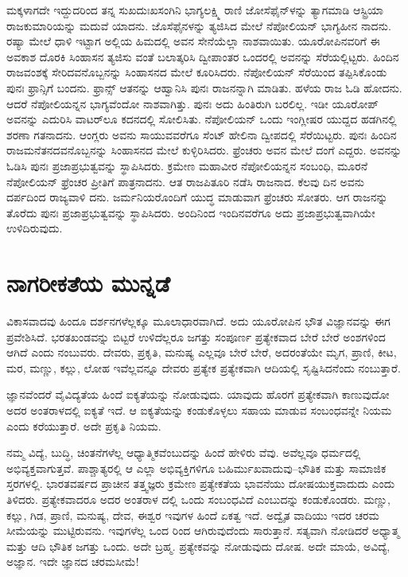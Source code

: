 ಮಕ್ಕಳಾಗದೇ ಇದ್ದುದರಿಂದ ತನ್ನ ಸುಖದುಃಖಸಂಗಿನಿ ಭಾಗ್ಯಲಕ್ಷ್ಮಿ ರಾಣಿ ಜೋಸೆಫೈನ್​ಳನ್ನು ತ್ಯಾಗಮಾಡಿ ಆಸ್ಟ್ರಿಯಾ ರಾಜಕುಮಾರಿಯನ್ನು ಮದುವೆ ಯಾದನು. ಜೊಸೆಫೈನಳನ್ನು ತ್ಯಜಿಸಿದ ಮೇಲೆ ನೆಪೋಲಿಯನ್​ ಭಾಗ್ಯಹೀನ ನಾದನು. ರಷ್ಯಾ ಮೇಲೆ ಧಾಳಿ ಇಟ್ಟಾಗ ಅಲ್ಲಿಯ ಹಿಮದಲ್ಲಿ ಅವನ ಸೇನೆಯೆಲ್ಲಾ ನಾಶವಾಯಿತು. ಯೂರೋಪಿನವರಿಗೆ ಈ ಅವಕಾಶ ದೊರಕಿ ಸಿಂಹಾಸನ ತ್ಯಜಿಸು ವಂತೆ ಬಲಾತ್ಕರಿಸಿ ದ್ವೀಪಾಂತರ ಒಂದರಲ್ಲಿ ಅವನನ್ನು ಸೆರೆಯಲ್ಲಿಟ್ಟರು. ಹಿಂದಿನ ರಾಜವಂಶಕ್ಕೆ ಸೇರಿದವನೊಬ್ಬನನ್ನು ಸಿಂಹಾಸನದ ಮೇಲೆ ಕೂರಿಸಿದರು. ನೆಪೋಲಿಯನ್​ ಸೆರೆಯಿಂದ ತಪ್ಪಿಸಿಕೊಂಡು ಪುನಃ ಫ್ರಾನ್ಸಿಗೆ ಬಂದನು. ಫ್ರಾನ್ಸ್​ ಆತನನ್ನು ಆಹ್ವಾನಿಸಿ ಪುನಃ ರಾಜನನ್ನಾಗಿ ಮಾಡಿತು. ಹಳೆಯ ರಾಜ ಓಡಿ ಹೋದನು. ಆದರೆ ನೆಪೋಲಿಯನ್ನನ ಭಾಗ್ಯವೆಂದೋ ನಾಶವಾಗಿತ್ತು. ಪುನಃ ಅದು ಹಿಂತಿರುಗಿ ಬರಲಿಲ್ಲ. ಇಡೀ ಯೂರೋಪ್​ ಅವನನ್ನು ಎದುರಿಸಿ ವಾಟರ್​ಲೂ ಕದನದಲ್ಲಿ ಸೋಲಿಸಿತು. ನೆಪೋಲಿಯನ್​ ಒಂದು ಇಂಗ್ಲೀಷರ ಯುದ್ದದ ಹಡಗಿನಲ್ಲಿ ಶರಣಾ ಗತನಾದನು. ಆಂಗ್ಲರು ಅವನು ಸಾಯುವವರೆಗೂ ಸೆಂಟ್​ ಹೇಲಿನಾ ದ್ವೀಪದಲ್ಲಿ ಸೆರೆಯಿಟ್ಟರು. ಪುನಃ ಹಿಂದಿನ ರಾಜಮನೆತನದವನೊಬ್ಬನನ್ನು ಸಿಂಹಾಸನದ ಮೇಲೆ ಕುಳ್ಳಿರಿಸಿದರು. ಫ್ರೆಂಚರು ಅವನ ಮೇಲೆ ದಂಗೆ ಎದ್ದರು. ಅವನನ್ನು ಓಡಿಸಿ ಪುನಃ ಪ್ರಜಾಪ್ರಭುತ್ವವನ್ನು ಸ್ಥಾಪಿಸಿದರು. ಕ್ರಮೇಣ ಮಹಾವೀರ ನೆಪೋಲಿಯನ್ನನ ಸಂಬಂಧಿ, ಮೂರನೆ ನೆಪೋಲಿಯನ್​ ಫ್ರೆಂಚರ ಪ್ರೀತಿಗೆ ಪಾತ್ರನಾದನು. ಆತ ರಾಜಪಿತೂರಿ ನಡೆಸಿ ರಾಜನಾದ. ಕೆಲವು ದಿನ ಅವನು ದರ್ಪದಿಂದ ರಾಜ್ಯವಾಳಿ ದನು. ಜರ್ಮನಿಯರೊಂದಿಗೆ ಯುದ್ಧ ಮಾಡುವಾಗ ಫ್ರೆಂಚರು ಸೋತರು. ಆಗ ರಾಜನನ್ನು ತೊರೆದು ಪುನಃ ಪ್ರಜಾಪ್ರಭುತ್ವವನ್ನು ಸ್ಥಾಪಿಸಿದರು. ಅಂದಿನಿಂದ ಇಂದಿನವರೆಗೂ ಅದು ಪ್ರಜಾಪ್ರಭುತ್ವವಾಗಿಯೇ ಉಳಿದಿರುವುದು.


\section{ನಾಗರೀಕತೆಯ ಮುನ್ನಡೆ}

ವಿಕಾಸವಾದವು ಹಿಂದೂ ದರ್ಶನಗಳೆಲ್ಲಕ್ಕೂ ಮೂಲಾಧಾರವಾಗಿದೆ. ಅದು ಯೂರೋಪಿನ ಭೌತ ವಿಜ್ಞಾನವನ್ನು ಈಗ ಪ್ರವೇಶಿಸಿದೆ. ಭರತಖಂಡವನ್ನು ಬಿಟ್ಟರೆ ಉಳಿದೆಲ್ಲರೂ ಜಗತ್ತು ಸಂಪೂರ್ಣ ಪ್ರತ್ಯೇಕವಾದ ಬೇರೆ ಬೇರೆ ಅಂಶಗಳಿಂದ ಆಗಿದೆ ಎಂದು ನಂಬುವರು. ದೇವರು, ಪ್ರಕೃತಿ, ಮನುಷ್ಯ ಎಲ್ಲವೂ ಬೇರೆ ಬೇರೆ, ಅದರಂತೆಯೇ ಮೃಗ, ಪ್ರಾಣಿ, ಕೀಟ, ಮರ, ಮಣ್ಣು, ಕಲ್ಲು, ಲೋಹ ಇವೆಲ್ಲವನ್ನೂ ದೇವರು ಪ್ರತ್ಯೇಕ ಪ್ರತ್ಯೇಕವಾಗಿ ಆದಿಯಲ್ಲಿ ಸೃಷ್ಟಿಸಿದನೆಂದು ನಂಬುತ್ತಾರೆ.

ಜ್ಞಾನವೆಂದರೆ ವೈವಿದ್ಯತೆಯ ಹಿಂದೆ ಐಕ್ಯತೆಯನ್ನು ನೋಡುವುದು. ಯಾವುದು ಹೊರಗೆ ಪ್ರತ್ಯೇಕವಾಗಿ ಕಾಣುವುದೋ ಅದರ ಅಂತರಾಳದಲ್ಲಿ ಐಕ್ಯತೆ ಇದೆ. ಆ ಐಕ್ಯತೆಯನ್ನು ಕಂಡುಕೊಳ್ಳಲು ಸಹಾಯ ಮಾಡುವ ಸಂಬಂಧವನ್ನೇ ನಿಯಮ ಎಂದು ಕರೆಯುತ್ತಾರೆ. ಅದೇ ಪ್ರಕೃತಿ ನಿಯಮ.

ನಮ್ಮ ವಿದ್ಯೆ, ಬುದ್ಧಿ, ಚಿಂತನೆಗಳೆಲ್ಲ ಆಧ್ಯಾತ್ಮಿಕವೆಂಬುದನ್ನು ಹಿಂದೆ ಹೇಳಿರು ವೆವು. ಅವೆಲ್ಲವೂ ಧರ್ಮದಲ್ಲಿ ಅಭಿವ್ಯಕ್ತವಾಗುತ್ತವೆ. ಪಾಶ್ಚಾತ್ಯರಲ್ಲಿ ಆ ಎಲ್ಲಾ ಅಭಿವ್ಯಕ್ತಿಗಳಿಗೂ ಬಹಿರ್ಮುಖವಾದುವು–ಭೌತಿಕ ಮತ್ತು ಸಾಮಾಜಿಕ ಸ್ತರಗಳಲ್ಲಿ. ಭಾರತವರ್ಷದ ಪ್ರಾಚೀನ ತತ್ತ್ವಜ್ಞರು ಕ್ರಮೇಣ ಪ್ರತ್ಯೇಕತೆಯ ಭಾವನೆಯು ದೋಷಯುಕ್ತವಾದುದು ಎಂದು ತಿಳಿದರು. ಪ್ರತ್ಯೇಕವಾದರೂ ಅದರ ಅಂತರಾಳ ದಲ್ಲಿ ಒಂದು ಸಂಬಂಧವಿದೆ ಎಂಬುದನ್ನು ಕಂಡುಕೊಂಡರು. ಮಣ್ಣು, ಕಲ್ಲು, ಗಿಡ, ಪ್ರಾಣಿ, ಮನುಷ್ಯ, ದೇವ, ಈಶ್ವರ ಇವುಗಳ ಹಿಂದೆ ಏಕತ್ವ ಇದೆ. ಅದ್ವೈತ ವಾದಿಯು ಇದರ ಚರಮ ಸೀಮೆಯನ್ನು ಮುಟ್ಟಿರುವನು. ಇವುಗಳೆಲ್ಲ ಒಂದ ರಿಂದ ಆಗಿರುವುದೆಂದು ಸಾರುತ್ತಾನೆ. ಸತ್ಯವಾಗಿ ನೋಡಿದರೆ ಅಧ್ಯಾತ್ಮ ಮತ್ತು ಆದಿ ಭೌತಿಕ ಜಗತ್ತು ಒಂದು. ಅದೇ ಬ್ರಹ್ಮ. ಪ್ರತ್ಯೇಕವನ್ನು ನೋಡುವುದು ದೋಷ. ಅದೇ ಮಾಯೆ, ಅವಿದ್ಯೆ, ಅಜ್ಞಾನ. ಇದೇ ಜ್ಞಾನದ ಚರಮಸೀಮೆ!

